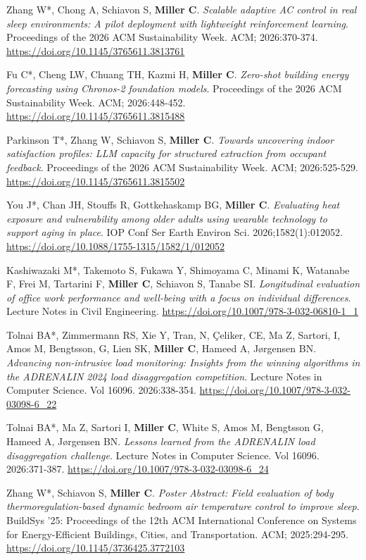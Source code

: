 \documentclass[10pt,a4paper]{article}
\begin{document}
\begin{small}
\begin{etaremune}
\item 
Zhang W*, Chong A, Schiavon S, \textbf{Miller C}. \emph{Scalable adaptive AC control in real sleep environments: A pilot deployment with lightweight reinforcement learning}. Proceedings of the 2026 ACM Sustainability Week. ACM; 2026:370-374. \url{https://doi.org/10.1145/3765611.3813761}
\item 
Fu C*, Cheng LW, Chuang TH, Kazmi H, \textbf{Miller C}. \emph{Zero-shot building energy forecasting using Chronos-2 foundation models}. Proceedings of the 2026 ACM Sustainability Week. ACM; 2026:448-452. \url{https://doi.org/10.1145/3765611.3815488}
\item 
Parkinson T*, Zhang W, Schiavon S, \textbf{Miller C}. \emph{Towards uncovering indoor satisfaction profiles: LLM capacity for structured extraction from occupant feedback}. Proceedings of the 2026 ACM Sustainability Week. ACM; 2026:525-529. \url{https://doi.org/10.1145/3765611.3815502}
\item 
You J*, Chan JH, Stouffs R, Gottkehaskamp BG, \textbf{Miller C}. \emph{Evaluating heat exposure and vulnerability among older adults using wearable technology to support aging in place}. IOP Conf Ser Earth Environ Sci. 2026;1582(1):012052. \url{https://doi.org/10.1088/1755-1315/1582/1/012052}
\item 
Kashiwazaki M*, Takemoto S, Fukawa Y, Shimoyama C, Minami K, Watanabe F, Frei M, Tartarini F, \textbf{Miller C}, Schiavon S, Tanabe SI. \emph{Longitudinal evaluation of office work performance and well-being with a focus on individual differences}. Lecture Notes in Civil Engineering. \url{https://doi.org/10.1007/978-3-032-06810-1_1}
\item 
Tolnai BA*, Zimmermann RS, Xie Y, Tran, N, Çeliker, CE, Ma Z, Sartori, I, Amos M, Bengtsson, G, Lien SK, \textbf{Miller C}, Hameed A, Jørgensen BN. \emph{Advancing non-intrusive load monitoring: Insights from the winning algorithms in the ADRENALIN 2024 load disaggregation competition}. Lecture Notes in Computer Science. Vol 16096. 2026:338-354. \url{https://doi.org/10.1007/978-3-032-03098-6_22}
\item 
Tolnai BA*, Ma Z, Sartori I, \textbf{Miller C}, White S, Amos M, Bengtsson G, Hameed A, Jørgensen BN. \emph{Lessons learned from the ADRENALIN load disaggregation challenge}. Lecture Notes in Computer Science. Vol 16096. 2026:371-387. \url{https://doi.org/10.1007/978-3-032-03098-6_24}
\item 
Zhang W*, Schiavon S, \textbf{Miller C}. \emph{Poster Abstract: Field evaluation of body thermoregulation-based dynamic bedroom air temperature control to improve sleep}. BuildSys '25: Proceedings of the 12th ACM International Conference on Systems for Energy-Efficient Buildings, Cities, and Transportation. ACM; 2025:294-295. \url{https://doi.org/10.1145/3736425.3772103}

\end{etaremune}
\end{small}
\end{document}

